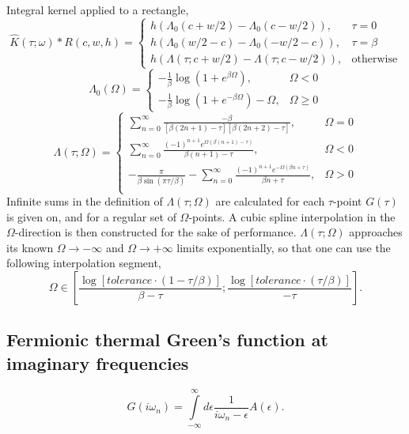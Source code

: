 \documentclass[]{article}
\begin{document}
Integral kernel applied to a rectangle,
\begin{equation}
	\hat K(\tau;\omega)*R(c,w,h) = \left\{ 
	\begin{array}{ll}
	h(\Lambda_0(c + w/2) - \Lambda_0(c - w/2)), & \tau = 0 \\
	h(\Lambda_0(w/2 - c) - \Lambda_0(-w/2-c)), & \tau = \beta \\
	h(\Lambda(\tau;c + w/2) - \Lambda(\tau;c - w/2)), & \mathrm{otherwise}
	\end{array}\right.
\end{equation}
\begin{equation}
	\Lambda_0(\Omega) = \left\{ 
	\begin{array}{ll}
	-\frac{1}{\beta}\log(1 + e^{\beta\Omega}), & \Omega < 0 \\
	-\frac{1}{\beta}\log(1 + e^{-\beta\Omega}) - \Omega, & \Omega \ge 0
	\end{array}\right.
\end{equation}
\begin{equation}
	\Lambda(\tau;\Omega) = \left\{
	\begin{array}{ll}
	\sum_{n=0}^\infty\frac{-\beta}{[\beta(2n+1)-\tau][\beta(2n+2)-\tau]},
	& \Omega = 0 \\
	\sum_{n=0}^\infty\frac{(-1)^{n+1}e^{\Omega(\beta(n+1)-\tau)}}{\beta(n+1)-\tau},
	& \Omega < 0 \\
	-\frac{\pi}{\beta \sin(\pi\tau/\beta)}
	-\sum_{n=0}^\infty\frac{(-1)^{n+1}e^{-\Omega(\beta n +\tau)}}{\beta n+\tau},
	& \Omega > 0 \\
	\end{array}
	\right.
\end{equation}
Infinite sums in the definition of $\Lambda(\tau;\Omega)$ are calculated for each $\tau$-point $G(\tau)$ is given on, and for a regular set of $\Omega$-points. A cubic spline interpolation in the $\Omega$-direction is then constructed for the sake of performance. $\Lambda(\tau;\Omega)$ approaches its known $\Omega\to-\infty$ and $\Omega\to+\infty$ limits exponentially, so that one can use the following interpolation
segment,
\begin{equation}
	\Omega \in [\frac{\log[tolerance\cdot(1-\tau/\beta)]}{\beta-\tau};
				\frac{\log[tolerance\cdot(\tau/\beta)]}{-\tau}].
\end{equation}

\subsection{Fermionic thermal Green's function at imaginary frequencies}
\begin{equation}
	G(i\omega_n) = \int\limits_{-\infty}^\infty
	d\epsilon \frac{1}{i\omega_n-\epsilon} A(\epsilon).
\end{equation}
\end{document}
